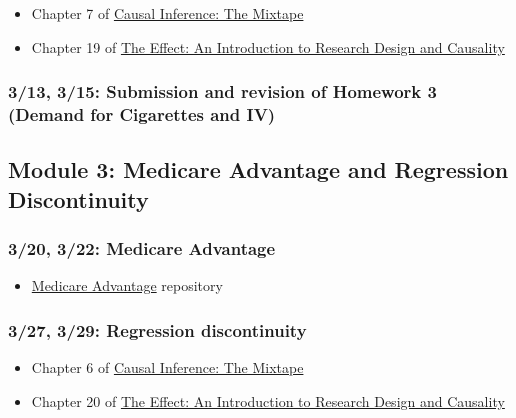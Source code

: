 \documentclass[11pt,]{article}
\providecommand{\tightlist}{%
  \setlength{\itemsep}{0pt}\setlength{\parskip}{0pt}}
\begin{document}
\begin{itemize}
\tightlist
\item
  Chapter 7 of \href{https://mixtape.scunning.com/}{Causal Inference:
  The Mixtape}
\item
  Chapter 19 of \href{https://theeffectbook.net/}{The Effect: An
  Introduction to Research Design and Causality}
\end{itemize}

\hypertarget{submission-and-revision-of-homework-3-demand-for-cigarettes-and-iv}{%
\subsubsection{3/13, 3/15: Submission and revision of Homework 3 (Demand
for Cigarettes and
IV)}\label{submission-and-revision-of-homework-3-demand-for-cigarettes-and-iv}}

\hypertarget{module-3-medicare-advantage-and-regression-discontinuity}{%
\subsection{Module 3: Medicare Advantage and Regression
Discontinuity}\label{module-3-medicare-advantage-and-regression-discontinuity}}

\hypertarget{medicare-advantage}{%
\subsubsection{3/20, 3/22: Medicare
Advantage}\label{medicare-advantage}}

\begin{itemize}
\tightlist
\item
  \href{https://github.com/imccart/Medicare-Advantage}{Medicare
  Advantage} repository
\end{itemize}

\hypertarget{regression-discontinuity}{%
\subsubsection{3/27, 3/29: Regression
discontinuity}\label{regression-discontinuity}}

\begin{itemize}
\tightlist
\item
  Chapter 6 of \href{https://mixtape.scunning.com/}{Causal Inference:
  The Mixtape}
\item
  Chapter 20 of \href{https://theeffectbook.net/}{The Effect: An
  Introduction to Research Design and Causality}
\end{itemize}
\end{document}
